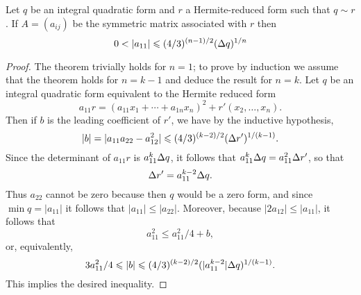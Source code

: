\begin{theoremx}
  {\normalfont \cite[p.~59ff]{jones1950arithmetic}} Let \(q\) be an integral
  quadratic form and \(r\) a Hermite-reduced form such that \(q \sim r\). If \(A
  = (a_{ij})\) be the symmetric matrix associated with \(r\) then
  \[
    0 < |a_{11}| \leqslant (4/3)^{(n-1)/2} ({{\Delta} q})^{1/n}
  \]
\end{theoremx}

\begin{proof}
  The theorem trivially holds for \(n = 1\); to prove by induction we assume
  that the theorem holds for \(n = k - 1\) and deduce the result for \(n = k\).
  Let \(q\) be an integral quadratic form equivalent to the Hermite reduced form
  \[
    a_{11} r = (a_{11}x_1 + \cdots + a_{1n}x_n)^2 + r'(x_2, \dots, x_n).
  \]
  Then if \(b\) is the leading coefficient of \(r'\), we have by the inductive
  hypothesis,
  \[
    |b| = |a_{11}a_{22} - a_{12}^2| \leqslant (4/3)^{(k-2)/2} ({{\Delta} r'})^{1/(k-1)}.
  \]
  Since the determinant of \(a_{11} r\) is \(a_{11}^k {\Delta} q\), it follows
  that \(a_{11}^k {\Delta} q = a_{11}^2 {\Delta} r'\), so that \[{\Delta} r' =
  a_{11}^{k-2} {\Delta} q.\] Thus \(a_{22}\) cannot be zero because then \(q\)
  would be a zero form, and since \(\min q = |a_{11}|\) it follows that
  \(|a_{11}| \leq |a_{22}|\). Moreover, because \(|2a_{12}| \leq |a_{11}|\), it
  follows that
  \[
    a_{11}^2 \leq a_{11}^2/4 + b,
  \]
  or, equivalently,
  \[
    3a_{11}^2/4 \leqslant |b| \leqslant (4/3)^{(k-2)/2} (|a^{k-2}_{11}| {\Delta} q)^{1/(k-1)}.
  \]
  This implies the desired inequality.
\end{proof}